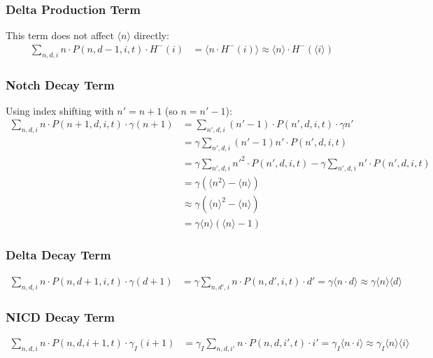 \documentclass{article}
\begin{document}
\begin{flushleft}
\subsubsection*{Delta Production Term}
This term does not affect $\langle n \rangle$ directly:
\begin{align*}
\sum_{n,d,i} n \cdot P(n,d-1,i,t) \cdot H^-(i) &= \langle n \cdot H^-(i) \rangle
\approx \langle n \rangle \cdot H^-(\langle i \rangle)
\end{align*}

\subsubsection*{Notch Decay Term}
Using index shifting with $n' = n+1$ (so $n = n'-1$):
\begin{align*}
\sum_{n,d,i} n \cdot P(n+1,d,i,t) \cdot \gamma(n+1) &= \sum_{n',d,i} (n'-1) \cdot P(n',d,i,t) \cdot \gamma n' \\
&= \gamma \sum_{n',d,i} (n'-1)n' \cdot P(n',d,i,t) \\
&= \gamma \sum_{n',d,i} n'^2 \cdot P(n',d,i,t) - \gamma \sum_{n',d,i} n' \cdot P(n',d,i,t) \\
&= \gamma(\langle n^2 \rangle - \langle n \rangle) \\
&\approx \gamma(\langle n \rangle^2 - \langle n \rangle) \\
&= \gamma \langle n \rangle (\langle n \rangle - 1)
\end{align*}

\subsubsection*{Delta Decay Term}
\begin{align*}
\sum_{n,d,i} n \cdot P(n,d+1,i,t) \cdot \gamma(d+1) &= \gamma \sum_{n,d',i} n \cdot P(n,d',i,t) \cdot d' = \gamma \langle n \cdot d \rangle \approx \gamma \langle n \rangle \langle d \rangle
\end{align*}

\subsubsection*{NICD Decay Term}
\begin{align*}
\sum_{n,d,i} n \cdot P(n,d,i+1,t) \cdot \gamma_I(i+1) &= \gamma_I \sum_{n,d,i'} n \cdot P(n,d,i',t) \cdot i' = \gamma_I \langle n \cdot i \rangle \approx \gamma_I \langle n \rangle \langle i \rangle
\end{align*}


\end{flushleft}
\end{document}
